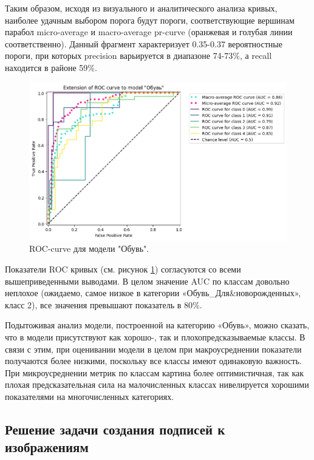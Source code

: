 \documentclass[a4paper,12pt]{extarticle}
\begin{document}
Таким образом, исходя из визуального и аналитического анализа кривых, наиболее удачным выбором порога будут пороги, соответствующие вершинам парабол micro-average и macro-average pr-curve (оранжевая и голубая линии соответственно). Данный фрагмент характеризует 0.35-0.37 вероятностные пороги, при которых precision варьируется в диапазоне 74-73\%, а recall находится в районе 59\%.

\begin{figure}[h]
	\centering
	\includegraphics[scale=0.6]{roc_curves/roccurve_Обувь.png}
	\caption{ROC-curve для модели "Обувь".}
	\label{fig:roccurve_Обувь2}
\end{figure}

Показатели ROC кривых (см. рисунок \ref{fig:roccurve_Обувь2}) согласуются со всеми вышеприведенными выводами. В целом значение AUC по классам довольно неплохое (ожидаемо, самое низкое в категории «Обувь\_Для\&новорожденных», класс 2), все значения превышают показатель в 80\%.

Подытоживая анализ модели, построенной на категорию «Обувь», можно сказать, что в модели присутствуют как хорошо-, так и плохопредсказываемые классы. В связи с этим, при оценивании модели в целом при макроусреднении показатели получаются более низкими, поскольку все классы имеют одинаковую важность. При микроусреднении метрик по классам картина более оптимистичная, так как плохая предсказательная сила на малочисленных классах нивелируется хорошими показателями на многочисленных категориях.


\subsection{Решение задачи создания подписей к изображениям}
\end{document}
